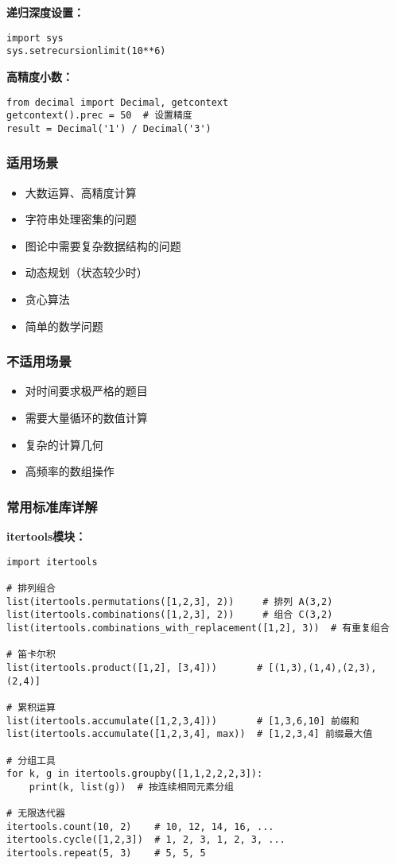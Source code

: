 \documentclass[a4paper,9pt,twocolumn]{ctexart}
\begin{document}
\textbf{递归深度设置：}
\begin{verbatim}
import sys
sys.setrecursionlimit(10**6)
\end{verbatim}

\textbf{高精度小数：}
\begin{verbatim}
from decimal import Decimal, getcontext
getcontext().prec = 50  # 设置精度
result = Decimal('1') / Decimal('3')
\end{verbatim}

\subsubsection{适用场景}
\begin{itemize}
\item 大数运算、高精度计算
\item 字符串处理密集的问题
\item 图论中需要复杂数据结构的问题
\item 动态规划（状态较少时）
\item 贪心算法
\item 简单的数学问题
\end{itemize}

\subsubsection{不适用场景}
\begin{itemize}
\item 对时间要求极严格的题目
\item 需要大量循环的数值计算
\item 复杂的计算几何
\item 高频率的数组操作
\end{itemize}

\subsubsection{常用标准库详解}

\textbf{itertools模块：}
\begin{verbatim}
import itertools

# 排列组合
list(itertools.permutations([1,2,3], 2))     # 排列 A(3,2)
list(itertools.combinations([1,2,3], 2))     # 组合 C(3,2)
list(itertools.combinations_with_replacement([1,2], 3))  # 有重复组合

# 笛卡尔积
list(itertools.product([1,2], [3,4]))       # [(1,3),(1,4),(2,3),(2,4)]

# 累积运算
list(itertools.accumulate([1,2,3,4]))       # [1,3,6,10] 前缀和
list(itertools.accumulate([1,2,3,4], max))  # [1,2,3,4] 前缀最大值

# 分组工具
for k, g in itertools.groupby([1,1,2,2,2,3]):
    print(k, list(g))  # 按连续相同元素分组

# 无限迭代器
itertools.count(10, 2)    # 10, 12, 14, 16, ...
itertools.cycle([1,2,3])  # 1, 2, 3, 1, 2, 3, ...
itertools.repeat(5, 3)    # 5, 5, 5
\end{verbatim}
\end{document}
